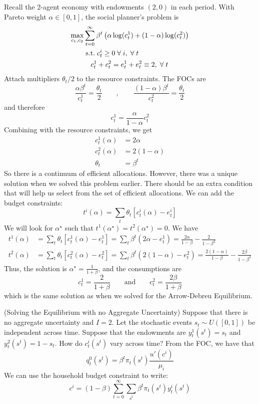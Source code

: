 \documentclass[10pt]{article}
\begin{document}
\begin{example}
	Recall the 2-agent economy with endowments $(2,0)$ in each period. With Pareto weight $\alpha \in [0,1]$, the social planner's problem is
	\begin{align*}
		\max_{c_1,c_2} & \sum_{t=0}^\infty \beta^t \parl \alpha \log(c_t^1) + (1-\alpha) \log(c_t^2) \parr \\
		& \st c_t^i \ge 0 \forall i,\forall t \\
		& \quad c_t^1 + c_t^2 = e_t^1 + e_t^2 \equiv 2, \forall t
	\end{align*}
	Attach multipliers $\theta_t / 2$ to the resource constraints. The FOCs are
	\[
	\frac{\alpha \beta^t}{c_t^1} = \frac{\theta_t}{2	} \qquad , \qquad \frac{(1-\alpha) \beta^t}{c_t^2} = \frac{\theta_t}{2	}
	\]
	and therefore
	\[
	c_t^1 = \frac{\alpha}{1-\alpha} c_t^2
	\]
	Combining with the resource constraints, we get
	\begin{align*}
		c_t^1(\alpha) &= 2\alpha \\
		c_t^2(\alpha) &= 2(1-\alpha) \\
		\theta_t &= \beta^t
	\end{align*}
	So there is a continuum of efficient allocations. However, there was a unique solution when we solved this problem earlier. There should be an extra condition that will help us select from the set of efficient allocations. We can add the budget constraints:
	\[
	t^i(\alpha) = \sum_t \theta_t [c_t^i(\alpha) - e_t^i]
	\]
	We will look for $\alpha^\star$ such that $t^1(\alpha^\star) = t^2(\alpha^\star) = 0$. We have
	\begin{align*}
		t^1(\alpha) &= \sum_t \theta_t[c_t^1(\alpha) - e_t^1] = \sum_t \beta^t (2\alpha - e_t^1) = \frac{2\alpha}{1 - \beta} - \frac{2}{1 - \beta^2} \\
		t^2(\alpha) &= \sum_t \theta_t[c_t^2(\alpha) - e_t^2] = \sum_t \beta^t (2(1 - \alpha) - e_t^2) = \frac{2(1 - \alpha)}{1 - \beta} - \frac{2\beta}{1 - \beta^2}
	\end{align*}
	Thus, the solution is $\alpha^\star = \frac{1}{1 + \beta}$, and the consumptions are
	\[
	c_t^1 = \frac{2}{1+\beta} \qquad \text{and} \qquad c_t^2 = \frac{2\beta}{1 + \beta}
	\]
	which is the same solution as when we solved for the Arrow-Debreu Equilibrium.
\end{example}

\begin{example}
	(Solving the Equilibrium with no Aggregate Uncertainty) Suppose that there is no aggregate uncertainty and $I = 2$. Let the stochastic events $s_t \sim U([0,1])$ be independent across time. Suppose that the endowments are $y_t^1(s^t) = s_t$ and $y_t^2(s^t) = 1 - s_t$. How do $c_t^i(s^t)$ vary across time? From the FOC, we have that
	\[
	q_t^0(s^t) = \beta^t \pi_t(s^t) \frac{u'(c^i)}{\mu_i}
	\]
	We can use the household budget constraint to write:
	\[
	c^i = (1-\beta) \sum_{t=0}^\infty \sum_{s^t} \beta^t \pi_t(s^t)y_t^i(s^t)
	\]
\end{example}
\end{document}
